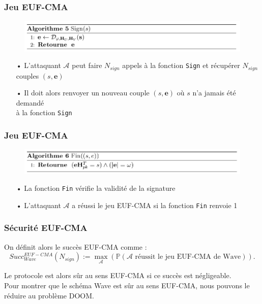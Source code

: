 \documentclass[10pt,a4paper]{beamer}
\theoremstyle{plain}
\theoremstyle{definition}
\newcommand{\e}{\mathbf{e}}
\begin{document}
\begin{frame}[fragile]
\frametitle{Jeu EUF-CMA}	
\begin{figure}[h]
		\includegraphics[width=\textwidth]{sign.png}
\end{figure}

\vspace{0.1in}

\begin{itemize}
\item[•] L'attaquant $\mathcal{A}$ peut faire $N_{sign}$ appels à la fonction \verb|Sign| et récupérer $N_{sign}$ couples $(s,\e)$
\vspace{0.1in}
\item[•] Il doit alors renvoyer un nouveau couple $(s,\e)$ où $s$ n'a jamais été demandé \\à la fonction \verb|Sign|
\end{itemize}

\end{frame}

\begin{frame}[fragile]
\frametitle{Jeu EUF-CMA}	
\begin{figure}[h]
		\includegraphics[width=\textwidth]{fin.png}
\end{figure}

\vspace{0.1in}

\begin{itemize}
\item[•] La fonction \verb|Fin| vérifie la validité de la signature
\vspace{0.1in}
\item[•] L'attaquant $\mathcal{A}$ a réussi le jeu EUF-CMA si la fonction \verb|Fin| renvoie 1
\end{itemize}
\end{frame}

\begin{frame}[fragile]
\frametitle{Sécurité EUF-CMA}
\begin{block}{}
On définit alors le succès EUF-CMA comme :
$$Succ^{EUF-CMA}_{Wave}(N_{sign}) := \max_{\mathcal{A}}(\mathbb{P}(\mathcal{A}\text{ réussit le jeu EUF-CMA de Wave})).$$
\end{block}	
\vspace{0.2in}
Le protocole est alors sûr au sens EUF-CMA si ce succès est négligeable. \\
\vspace{0.2in}
Pour montrer que le schéma Wave est sûr au sens EUF-CMA, nous pouvons le réduire au problème DOOM.\\
\end{frame}
\end{document}
